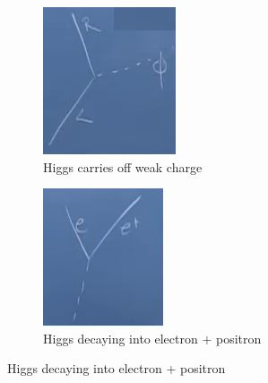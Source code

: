 \documentclass[]{article}
\begin{document}
\begin{figure}[H]
	\caption[Higgs interacting with Fermions]{Higgs interacting with Fermions: two forms of the same diagram}
	\begin{subfigure}[t]{0.45\textwidth}
		\caption{Higgs carries off weak charge}\label{fig:2-10-Higgs-emitted}
		\includegraphics[width=\textwidth]{2-10-Higgs-emitted}
	\end{subfigure}
	\begin{subfigure}[t]{0.45\textwidth}
		\caption{Higgs decaying into electron + positron}\label{fig:2-10-Higgs-decaying}
		\includegraphics[width=\textwidth]{2-10-Higgs-decaying}

\end{subfigure}
\end{figure}
\end{document}
